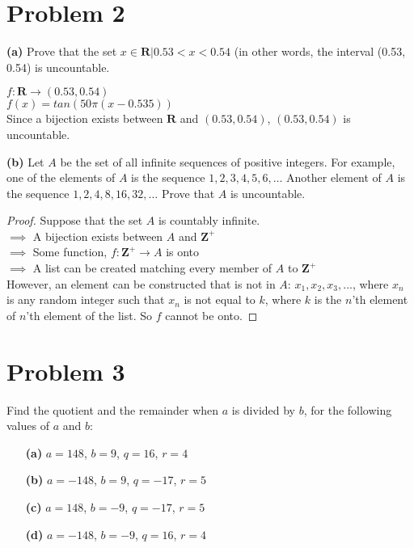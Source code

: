 \documentclass{article}
\newenvironment{problem}[1]{
  \nobreak\section*{Problem #1}
}{}
\begin{document}
  \begin{problem}{2}
    \begin{center}
      \textbf{(a)} Prove that the set ${x \in \mathbf{R} | 0.53 < x < 0.54}$ (in other words, the interval (0.53, 0.54) is uncountable.
    \end{center}
    \begin{center}
      $f : \mathbf{R} \rightarrow (0.53, 0.54)$\\
      $f(x) = tan(50\pi(x - 0.535))$\\
      Since a bijection exists between $\mathbf{R}$ and $(0.53, 0.54)$, $(0.53, 0.54)$ is uncountable.
    \end{center}

    \begin{center}
      \textbf{(b)} Let $A$ be the set of all infinite sequences of positive integers. For example, one of the elements of $A$ is the sequence $1, 2, 3, 4, 5, 6, \dots$ Another element of $A$ is the sequence $1, 2, 4, 8, 16, 32, \dots$ Prove that $A$ is uncountable.
    \end{center}
    \begin{proof}
      Suppose that the set $A$ is countably infinite.\\
      $\implies$ A bijection exists between $A$ and $\mathbf{Z^{+}}$\\
      $\implies$ Some function, $f : \mathbf{Z^{+}} \rightarrow A$ is onto\\
      $\implies$ A list can be created matching every member of $A$ to $\mathbf{Z^{+}}$\\
      However, an element can be constructed that is not in $A$: $x_1, x_2, x_3, ...$, where $x_n$ is any random integer such that $x_n$ is not equal to $k$, where $k$ is the $n$'th element of $n$'th element of the list.  So $f$ cannot be onto. 
    \end{proof}
  \end{problem}

  \begin{problem}{3}
    Find the quotient and the remainder when $a$ is divided by $b$, for the following values of $a$ and $b$:
    \begin{enumerate}
      \item[\textbf{(a)}] $a = 148$, $b = 9$, $q = 16$, $r = 4$
      \item[\textbf{(b)}] $a = -148$, $b = 9$, $q = -17$, $r = 5$
      \item[\textbf{(c)}] $a = 148$, $b = -9$, $q = -17$, $r = 5$
      \item[\textbf{(d)}] $a = -148$, $b = -9$, $q = 16$, $r = 4$
    \end{enumerate}
  \end{problem}
\end{document}

